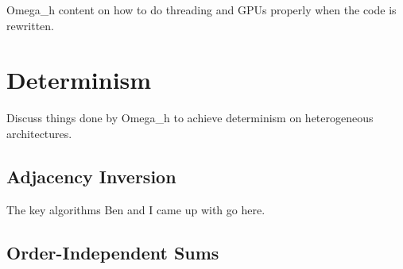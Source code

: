 Omega\_h content on how to do threading and GPUs properly
when the code is rewritten.

\section{Determinism}
\label{sec:determinism}

Discuss things done by Omega\_h to achieve
determinism on heterogeneous architectures.

\subsection{Adjacency Inversion}

The key algorithms Ben and I came up with go here.

\subsection{Order-Independent Sums}


